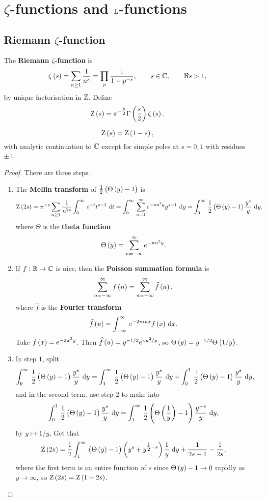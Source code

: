 \pagebreak

\section{\texorpdfstring{$ \zeta $}{Zeta}-functions and \texorpdfstring{$ \mathrm{L} $}{L}-functions}

\subsection{Riemann \texorpdfstring{$ \zeta $}{zeta}-function}


The \textbf{Riemann $ \zeta $-function} is
$$ \zeta\br{s} = \sum_{n \ge 1} \dfrac{1}{n^s} = \prod_p \dfrac{1}{1 - p^{-s}}, \qquad s \in \CC, \qquad \Re s > 1, $$
by unique factorisation in $ \mathbb{Z} $. Define
$$ \Z\br{s} = \pi^{-\tfrac{s}{2}}\Gamma\br{\dfrac{s}{2}}\zeta\br{s}. $$

\begin{theorem}
\label{thm:9.1}
$$ \Z\br{s} = \Z\br{1 - s}, $$
with analytic continuation to $ \mathbb{C} $ except for simple poles at $ s = 0, 1 $ with residues $ \pm 1 $.
\end{theorem}

\begin{proof}
There are three steps.
\begin{enumerate}[leftmargin=0.5in, label=Step \arabic*.]
\item The \textbf{Mellin transform} of $ \tfrac{1}{2}\br{\Theta\br{y} - 1} $ is
$$ \Z\br{2s} = \pi^{-s}\sum_{n \ge 1} \dfrac{1}{n^{2s}}\intd{0}{\infty}{e^{-t}t^{s - 1}}{t} = \intd{0}{\infty}{\sum_{n = 1}^\infty e^{-\pi n^2y}y^{s - 1}}{y} = \intd{0}{\infty}{\dfrac{1}{2}\br{\Theta\br{y} - 1}\dfrac{y^s}{y}}{y}, $$
where $ \Theta $ is the \textbf{theta function}
$$ \Theta\br{y} = \sum_{n = -\infty}^\infty e^{-\pi n^2y}. $$
\item If $ f : \mathbb{R} \to \mathbb{C} $ is nice, then the \textbf{Poisson summation formula} is
$$ \sum_{n = -\infty}^\infty f\br{n} = \sum_{n = -\infty}^\infty \widehat{f}\br{n}, $$
where $ \widehat{f} $ is the \textbf{Fourier transform}
$$ \widehat{f}\br{u} = \intd{-\infty}{\infty}{e^{-2\pi iux}f\br{x}}{x}. $$
Take $ f\br{x} = e^{-\pi x^2y} $. Then $ \widehat{f}\br{u} = y^{-1 / 2}e^{\pi u^2 / y} $, so $ \Theta\br{y} = y^{-1 / 2}\Theta\br{1 / y} $.
\item In step $ 1 $, split
$$ \intd{0}{\infty}{\dfrac{1}{2}\br{\Theta\br{y} - 1}\dfrac{y^s}{y}}{y} = \intd{1}{\infty}{\dfrac{1}{2}\br{\Theta\br{y} - 1}\dfrac{y^s}{y}}{y} + \intd{0}{1}{\dfrac{1}{2}\br{\Theta\br{y} - 1}\dfrac{y^s}{y}}{y}, $$
and in the second term, use step $ 2 $ to make into
$$ \intd{0}{1}{\dfrac{1}{2}\br{\Theta\br{y} - 1}\dfrac{y^s}{y}}{y} = \intd{1}{\infty}{\dfrac{1}{2}\br{\Theta\br{\dfrac{1}{y}} - 1}\dfrac{y^{-s}}{y}}{y}, $$
by $ y \mapsto 1 / y $. Get that
$$ \Z\br{2s} = \dfrac{1}{2}\intd{1}{\infty}{\br{\Theta\br{y} - 1}\br{y^s + y^{\tfrac{1}{2} - s}}\dfrac{1}{y}}{y} + \dfrac{1}{2s - 1} - \dfrac{1}{2s}, $$
where the first term is an entire function of $ s $ since $ \Theta\br{y} - 1 \to 0 $ rapidly as $ y \to \infty $, so $ \Z\br{2s} = \Z\br{1 - 2s} $.
\end{enumerate}
\end{proof}

